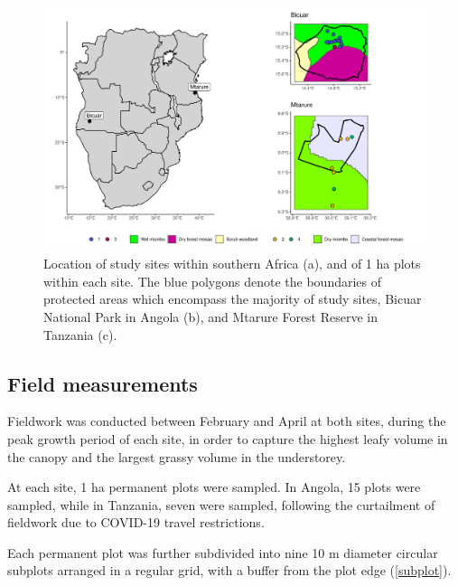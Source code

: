 \documentclass[11pt,a4paper]{article}
\begin{document}
\begin{figure}[H]
\centering
	\includegraphics[width=\textwidth]{map}
	\caption{Location of study sites within southern Africa (a), and of 1 ha plots within each site. The blue polygons denote the boundaries of protected areas which encompass the majority of study sites, Bicuar National Park in Angola (b), and Mtarure Forest Reserve in Tanzania (c).}
	\label{map}
\end{figure}

\subsection{Field measurements}

Fieldwork was conducted between February and April at both sites, during the peak growth period of each site, in order to capture the highest leafy volume in the canopy and the largest grassy volume in the understorey.

At each site, 1 ha permanent plots were sampled. In Angola, 15 plots were sampled, while in Tanzania, seven were sampled, following the curtailment of fieldwork due to COVID-19 travel restrictions.

Each permanent plot was further subdivided into nine 10 m diameter circular subplots arranged in a regular grid, with a buffer from the plot edge (\autoref{subplot}).
\end{document}
